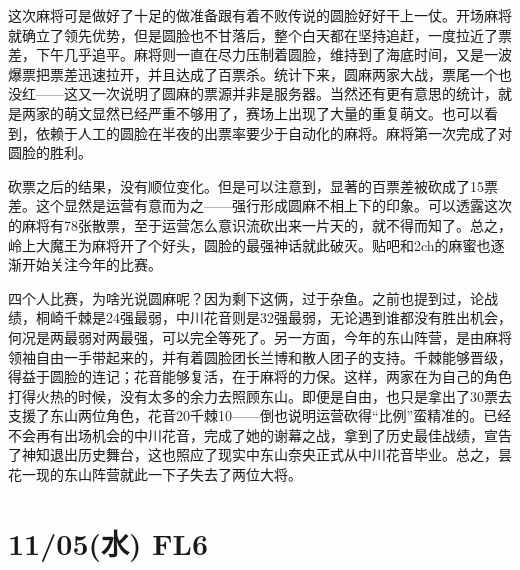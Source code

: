 这次麻将可是做好了十足的做准备跟有着不败传说的圆脸好好干上一仗。开场麻将就确立了领先优势，但是圆脸也不甘落后，整个白天都在坚持追赶，一度拉近了票差，下午几乎追平。麻将则一直在尽力压制着圆脸，维持到了海底时间，又是一波爆票把票差迅速拉开，并且达成了百票杀。统计下来，圆麻两家大战，票尾一个也没红——这又一次说明了圆麻的票源并非是服务器。当然还有更有意思的统计，就是两家的萌文显然已经严重不够用了，赛场上出现了大量的重复萌文。也可以看到，依赖于人工的圆脸在半夜的出票率要少于自动化的麻将。麻将第一次完成了对圆脸的胜利。

砍票之后的结果，没有顺位变化。但是可以注意到，显著的百票差被砍成了15票差。这个显然是运营有意而为之——强行形成圆麻不相上下的印象。可以透露这次的麻将有78张散票，至于运营怎么意识流砍出来一片天的，就不得而知了。总之，岭上大魔王为麻将开了个好头，圆脸的最强神话就此破灭。贴吧和2ch的麻蜜也逐渐开始关注今年的比赛。

四个人比赛，为啥光说圆麻呢？因为剩下这俩，过于杂鱼。之前也提到过，论战绩，桐崎千棘是24强最弱，中川花音则是32强最弱，无论遇到谁都没有胜出机会，何况是两最弱对两最强，可以完全等死了。另一方面，今年的东山阵营，是由麻将领袖自由一手带起来的，并有着圆脸团长兰博和散人团子的支持。千棘能够晋级，得益于圆脸的连记；花音能够复活，在于麻将的力保。这样，两家在为自己的角色打得火热的时候，没有太多的余力去照顾东山。即便是自由，也只是拿出了30票去支援了东山两位角色，花音20千棘10——倒也说明运营砍得“比例”蛮精准的。已经不会再有出场机会的中川花音，完成了她的谢幕之战，拿到了历史最佳战绩，宣告了神知退出历史舞台，这也照应了现实中东山奈央正式从中川花音毕业。总之，昙花一现的东山阵营就此一下子失去了两位大将。

\section{11/05(水) FL6}


